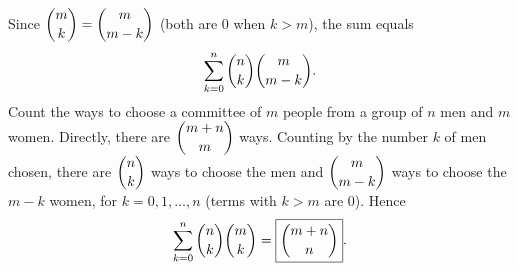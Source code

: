Since $\dbinom mk=\dbinom m{m-k}$ (both are $0$ when $k>m$), the sum equals
\[\sum_{k=0}^{n}\dbinom nk\dbinom m{m-k}.\]
Count the ways to choose a committee of $m$ people from a group of $n$ men and $m$ women. Directly, there are $\dbinom{m+n}{m}$ ways. Counting by the number $k$ of men chosen, there are $\dbinom nk$ ways to choose the men and $\dbinom m{m-k}$ ways to choose the $m-k$ women, for $k=0,1,\dots,n$ (terms with $k>m$ are $0$). Hence
\[\sum_{k=0}^{n}\dbinom nk\dbinom mk=\boxed{\dbinom{m+n}{n}}.\]
